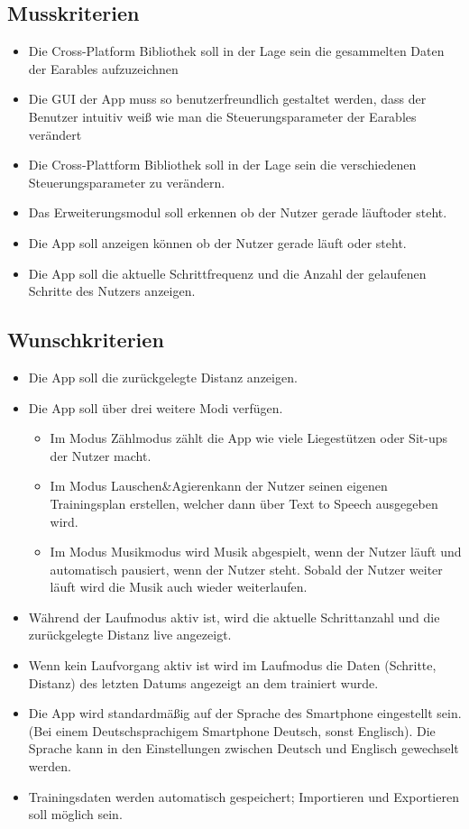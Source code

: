 \documentclass[a4paper,12pt]{article}
\begin{document}
\subsection{Musskriterien}

  \begin{itemize}
    \item Die \Gls{Cross-Platform Bibliothek} soll in der Lage sein die gesammelten Daten der \Gls{Earables} aufzuzeichnen
    \item Die \Gls{GUI} der App muss so benutzerfreundlich gestaltet werden, dass der Benutzer intuitiv weiß wie man die \Gls{Steuerungsparameter} der \Gls{Earables} verändert
    \item Die Cross-Plattform Bibliothek soll in der Lage sein die verschiedenen \Gls{Steuerungsparameter} zu verändern.
    \item Das Erweiterungsmodul soll erkennen ob der Nutzer gerade \glqq läuft\grqq{}oder \glqq steht\grqq.
    \item Die App soll anzeigen können ob der Nutzer gerade läuft oder steht.
    \item Die App soll die aktuelle Schrittfrequenz und die Anzahl der gelaufenen Schritte des Nutzers anzeigen.
  \end{itemize}
\subsection{Wunschkriterien}
  \begin{itemize}
    \item Die App soll die zurückgelegte Distanz anzeigen.
    \item Die App soll über drei weitere Modi verfügen.
      \begin{itemize}
        \item\text Im Modus \glqq Zählmodus\grqq{} zählt die App wie viele Liegestützen oder Sit-ups der Nutzer macht.
        \item\text  Im Modus \glqq Lauschen\&Agieren\grqq{}kann der Nutzer seinen eigenen Trainingsplan erstellen, welcher dann über Text to Speech ausgegeben wird.
        \item\text  Im Modus \glqq Musikmodus\grqq{} wird Musik abgespielt, wenn der Nutzer läuft und automatisch pausiert, wenn der Nutzer steht. Sobald der Nutzer weiter läuft wird die Musik auch wieder weiterlaufen.
      \end{itemize}
    \item\text Während der \glqq Laufmodus \grqq{} aktiv ist, wird die aktuelle Schrittanzahl und die zurückgelegte Distanz live angezeigt.
    \item\text Wenn kein Laufvorgang aktiv ist wird im Laufmodus die Daten (Schritte, Distanz) des letzten Datums angezeigt an dem trainiert wurde.
    
    \item\text Die App wird standardmäßig auf der Sprache des Smartphone eingestellt sein. (Bei einem Deutschsprachigem Smartphone Deutsch, sonst Englisch). Die Sprache kann in den Einstellungen zwischen Deutsch und Englisch gewechselt werden. 
    \item\text Trainingsdaten werden automatisch gespeichert; Importieren und Exportieren soll möglich sein.
  \end{itemize}
\end{document}
